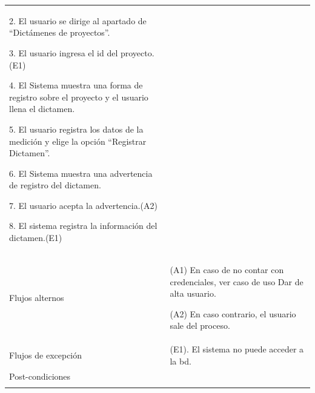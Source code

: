 \begin{longtable}{@{\extracolsep{8pt}}l p{8.5cm}}
 2. El usuario se dirige al apartado de “Dictámenes de proyectos”. \par\vspace{.1cm}

 3. El usuario ingresa el id del proyecto.(E1) \par\vspace{.1cm}

 4. El Sistema muestra una forma de registro sobre el proyecto y el usuario llena el dictamen. \par\vspace{.1cm}

 5. El usuario registra los datos de la  medición y elige la opción “Registrar Dictamen”. \par\vspace{.1cm}

 6. El Sistema muestra una advertencia de registro del  dictamen. \par\vspace{.1cm}

 7. El usuario acepta la advertencia.(A2) \par\vspace{.1cm}

 8. El sistema registra la información del dictamen.(E1) \par\vspace{.1cm}

\\

\hspace{.2cm}Flujos alternos & 
\par (A1) En caso de no contar con credenciales, ver caso de uso Dar de alta usuario.

\par (A2) En caso contrario, el usuario sale del proceso.



\\

\hspace{.2cm}Flujos de excepción & 
\par\vspace{.1cm} (E1). El sistema no puede acceder a la bd. 


\\%

\hspace{.2cm}Post-condiciones & 
\\
\hline

 \\
\end{longtable}
\endgroup


